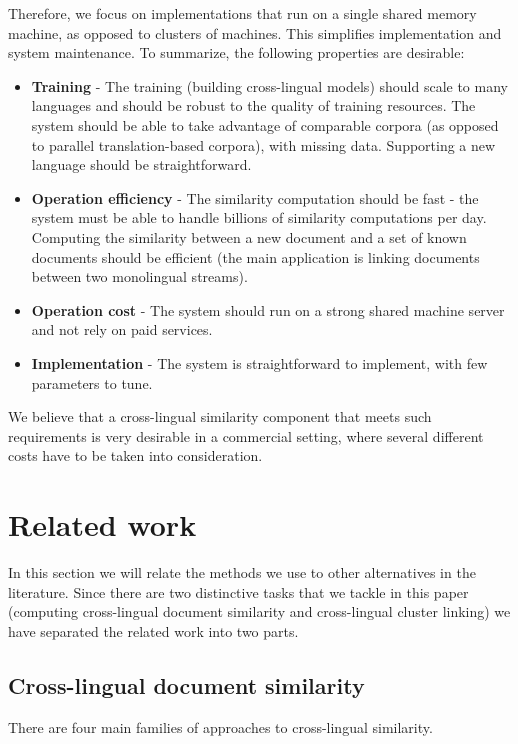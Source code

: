 \documentclass[twoside,11pt]{article}
\begin{document}
Therefore, we focus on implementations that run on a single shared memory machine, as opposed to clusters of machines. This  simplifies implementation and system maintenance.
To summarize, the following properties are desirable:
\begin{itemize}
\item \textbf{Training} - The training (building cross-lingual models) should scale to many languages and should be robust to the quality of training resources. The system should be able to take advantage of comparable corpora (as opposed to parallel translation-based corpora), with missing data. Supporting a new language should be straightforward.
\item \textbf{Operation efficiency} - The similarity computation should be fast - the system must be able to handle billions of similarity computations per day. Computing the similarity between a new document and a set of known documents should be efficient (the main application is linking documents between two monolingual streams).
\item \textbf{Operation cost} - The system should run on a strong shared machine server and not rely on paid services.
\item \textbf{Implementation} - The system is straightforward to implement, with few parameters to tune.
\end{itemize}
We believe that a cross-lingual similarity component that meets such requirements is very desirable in a commercial setting, where several different costs have to be taken into consideration.

\section{Related work}

In this section we will relate the methods we use to other alternatives in the literature. Since there are two distinctive tasks that we tackle in this paper (computing cross-lingual document similarity and cross-lingual cluster linking) we have separated the related work into two parts.

\subsection{Cross-lingual document similarity}

There are four main families of approaches to cross-lingual similarity.
\end{document}
